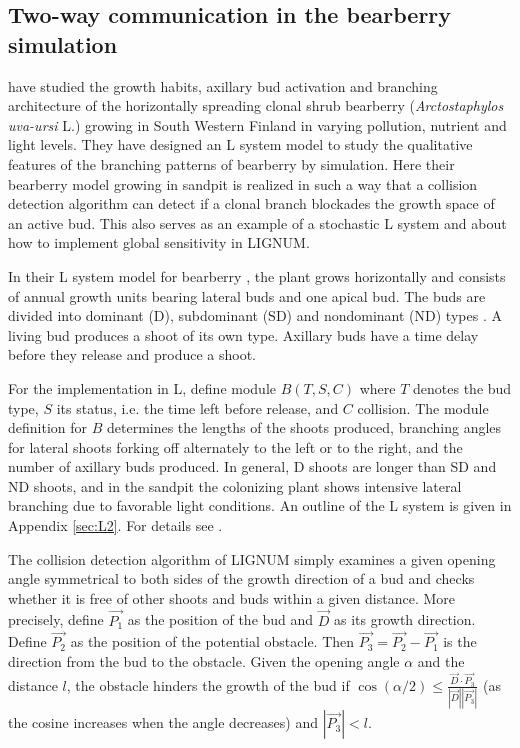 \subsection{Two-way communication in the bearberry simulation}
\label{sec:bearberry}

\citet{salemaa:02}  have  studied  the  growth  habits,  axillary  bud
activation  and branching architecture  of the  horizontally spreading
clonal shrub  bearberry (\textit{Arctostaphylos uva-ursi} L.)  growing
in  South Western  Finland in  varying pollution,  nutrient  and light
levels.  They have designed an L system model to study the qualitative
features of  the branching patterns of bearberry  by simulation.  Here
their bearberry  model growing  in sandpit is  realized in such  a way
that a  collision detection  algorithm can detect  if a  clonal branch
blockades the growth  space of an active bud.  This  also serves as an
example  of a  stochastic  L  system \citep{pp:90}  and  about how  to
implement global sensitivity \citep{kurth:94} in LIGNUM.

In their  L system model  for bearberry \citep{salemaa:02},  the plant
grows horizontally and consists of annual growth units bearing lateral
buds  and one apical  bud.  The  buds are  divided into  dominant (D),
subdominant  (SD) and nondominant  (ND) types  \citep{remphrey:83}.  A
living bud  produces a shoot  of its own  type.  Axillary buds  have a
time delay before they release and produce a shoot.

For  the  implementation in  L,  define  module  $B(T,S,C)$ where  $T$
denotes  the bud  type,  $S$ its  status,  i.e. the  time left  before
release, and $C$ collision.   The module definition for $B$ determines
the  lengths of  the  shoots produced,  branching  angles for  lateral
shoots forking  off alternately to the  left or to the  right, and the
number of  axillary buds  produced.  In general,  D shoots  are longer
than SD and  ND shoots, and in the sandpit  the colonizing plant shows
intensive  lateral branching  due to  favorable light  conditions.  An
outline  of the  L  system  is given  in  Appendix \ref{sec:L2}.   For
details see \citet{salemaa:02}.

The collision  detection algorithm of  LIGNUM simply examines  a given
opening angle symmetrical  to both sides of the  growth direction of a
bud and  checks whether it is free  of other shoots and  buds within a
given distance.   More precisely, define $\vec {P_1}$  as the position
of the bud and $\vec D$  as its growth direction.  Define $\vec {P_2}$
as the  position of  the potential obstacle.  Then $\vec {P_3}  = \vec
{P_2}
- \vec {P_1}$  is the direction from  the bud to  the obstacle.  Given
the opening angle $\alpha$ and  the distance $l$, the obstacle hinders
the growth  of the  bud if $\cos(\alpha/2)  \leq \frac{{\vec  D} \cdot
{\vec {P_3}}}  {|\vec D||\vec {P_3}|}$  (as the cosine  increases when
the angle decreases) and $|\vec {P_3}| < l$.

